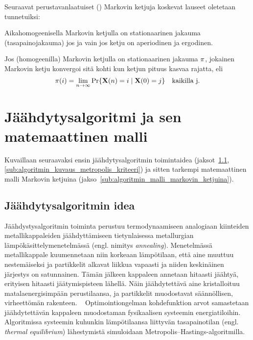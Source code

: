 Seuraavat perustavanlaatuiset (\cite{laarhoven, salamonetal}) Markovin ketjuja koskevat lauseet oletetaan tunnetuiksi:
\begin{lause}
    \label{lause:ketjun_stat_jakauma}
    Aikahomogeenisella Markovin ketjulla on stationaarinen jakauma (tasapainojakauma) jos ja vain jos ketju on aperiodinen ja ergodinen.
\end{lause}
\begin{lause}
    \label{lause:stat_jakauman_konvergenssi}
    Jos (homogeenilla) Markovin ketjulla on stationaarinen jakauma $\mathbf{\pi}$, jokainen Markovin ketju konvergoi sitä kohti kun ketjun pituus kasvaa rajatta, eli
    \begin{equation}
        \mathbf{\pi}(i) = \lim_{n \to \infty} \Pr\{\mathbf{X}(n) = i \mid \mathbf{X}(0) = j\} \quad \text{kaikilla j}.
    \end{equation}
\end{lause}

\section{Jäähdytysalgoritmi ja sen matemaattinen malli}
\label{sec:algoritmin_matemaattinen_malli}

Kuvaillaan seuraavaksi ensin jäähdytysalgoritmin toimintaidea (jaksot~\ref{sub:jaahdytysalgoritmin_idea}, \ref{sub:algoritmin_kuvaus_metropolis_kriteeri})
ja sitten tarkempi matemaattinen malli Markovin ketjuina (jakso~\ref{sub:algoritmin_malli_markovin_ketjuina}).

\subsection{Jäähdytysalgoritmin idea}
\label{sub:jaahdytysalgoritmin_idea}

Jäähdystysalgoritmin toiminta perustuu termodynaamiseen analogiaan kiinteiden metallikappaleiden jäähdyttämiseen tietynlaisessa metallurgian lämpökäsittelymenetelmässä (engl. nimitys \emph{annealing}).
Menetelmässä metallikappale kuumennetaan niin korkeaan lämpötilaan, että aine muuttuu nestemäiseksi ja partikkelit alkavat liikkua vapaasti ja niiden keskinäinen järjestys on satunnainen.
Tämän jälkeen kappaleen annetaan hitaasti jäähtyä, erityisen hitaasti jäätymispisteen lähellä.
Näin jäähdytettävä aine kristalloituu matalaenergisimpään perustilaansa,
ja partikkelit muodostavat säännöllisen, virheettömän rakenteen.
~\cite{kirkpatrick83, laarhoven}
Optimointiongelman kohdefunktion arvot samastetaan jäähdytettävän kappaleen muodostaman fysikaalisen systeemin energiatiloihin.
Algoritmissa systeemin kuhunkin lämpötilaansa liittyvän tasapainotilan (engl. \emph{thermal equilibrium}) lähestymistä simuloidaan Metropolis--Hastings-algoritmilla.
~\cite{kirkpatrick83, salamonetal}

